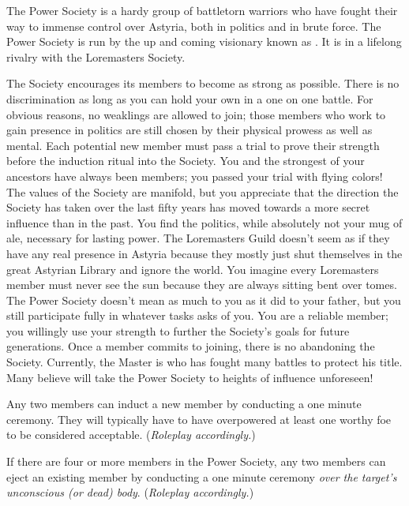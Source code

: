 \documentclass[blue]{guildcamp2}
\begin{document}
\name{\bPower{}}


The Power Society is a hardy group of battletorn warriors who have fought their way to immense control over Astyria, both in politics and in brute force. The Power Society is run by the up and coming visionary known as \cRed{}. It is in a lifelong rivalry with the Loremasters Society.

The Society encourages its members to become as strong as possible. There is no discrimination as long as you can hold your own in a one on one battle. For obvious reasons, no weaklings are allowed to join; those members who work to gain presence in politics are still chosen by their physical prowess as well as mental. Each potential new member must pass a trial to prove their strength before the induction ritual into the Society. You and the strongest of your ancestors have always been members; you passed your trial with flying colors! The values of the Society are manifold, but you appreciate that the direction the Society has taken over the last fifty years has moved towards a more secret influence than in the past. You find the politics, while absolutely not your mug of ale, necessary for lasting power. The Loremasters Guild doesn't seem as if they have any real presence in Astyria because they mostly just shut themselves in the great Astyrian Library and ignore the world. You imagine every Loremasters member must never see the sun because they are always sitting bent over tomes. The Power Society doesn't mean as much to you as it did to your father, but you still participate fully in whatever tasks \cRed{} asks of you. You are a reliable member; you willingly use your strength to further the Society's goals for future generations. Once a member commits to joining, there is no abandoning the Society. Currently, the Master is \cRed{} who has fought many battles to protect his title. Many believe \cRed{} will take the Power Society to heights of influence unforeseen!

Any two members can induct a new member by conducting a one minute ceremony. They will typically have to have overpowered at least one worthy foe to be considered acceptable. (\emph{Roleplay accordingly.})

If there are four or more members in the Power Society, any two members can eject an existing member by conducting a one minute ceremony \emph{over the target's unconscious (or dead) body}. (\emph{Roleplay accordingly.})
\end{document}
